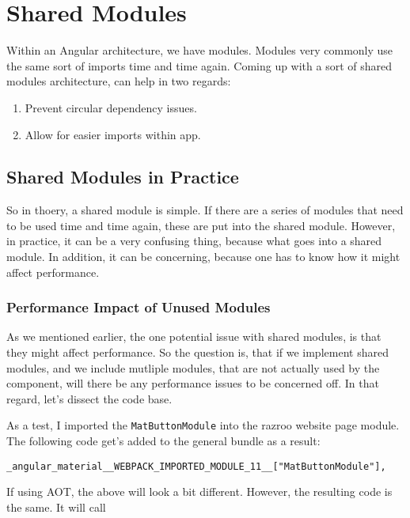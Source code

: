 \chapter{ Shared Modules }
Within an Angular architecture, we have modules. Modules very commonly use the same 
sort of imports time and time again. Coming up with a sort of shared modules 
architecture, can help in two regards: 

\begin{enumerate}
  \item Prevent circular dependency issues.
  \item Allow for easier imports within app.
\end{enumerate}

\section{Shared Modules in Practice}
So in thoery, a shared module is simple. If there are a series of modules that
need to be used time and time again, these are put into the shared module. However,
in practice, it can be a very confusing thing, because what goes into a shared module. 
In addition, it can be concerning, because one has to know how it might affect 
performance. 

\subsection{Performance Impact of Unused Modules}
As we mentioned earlier, the one potential issue with shared modules, is that
they might affect performance. So the question is, that if we implement shared 
modules, and we include mutliple modules, that are not actually used by the 
component, will there be any performance issues to be concerned off. In that 
regard, let's dissect the code base.

As a test, I imported the \lstinline{MatButtonModule} into the razroo website 
page module. The following code get's added to the general bundle as a 
result: 

\begin{lstlisting}[caption=Extra code for module]
_angular_material__WEBPACK_IMPORTED_MODULE_11__["MatButtonModule"],
\end{lstlisting}

If using AOT, the above will look a bit different. However, the resulting 
code is the same. It will call 
\begin{verbatim}

\end{verbatim}

